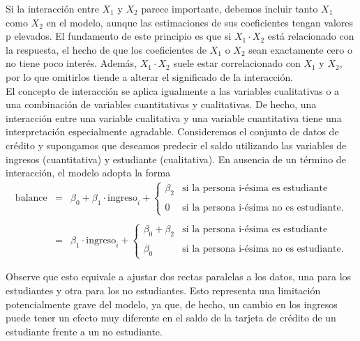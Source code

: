 Si la interacción entre $X_1$ y $X_2$ parece importante, debemos incluir tanto $X_1$ como $X_2$ en el modelo, aunque las estimaciones de sus coeficientes tengan valores p elevados. El fundamento de este principio es que si $X_1 \cdot X_2$ está relacionado con la respuesta, el hecho de que los coeficientes de $X_1$ o $X_2$ sean exactamente cero o no tiene poco interés. Además, $X_1 \cdot X_2$ suele estar correlacionado con $X_1$ y $X_2$, por lo que omitirlos tiende a alterar el significado de la interacción.\\

El concepto de interacción se aplica igualmente a las variables cualitativas o a una combinación de variables cuantitativas y cualitativas. De hecho, una interacción entre una variable cualitativa y una variable cuantitativa tiene una interpretación especialmente agradable. Consideremos el conjunto de datos de crédito y supongamos que deseamos predecir el saldo utilizando las variables de ingresos (cuantitativa) y estudiante (cualitativa). En ausencia de un término de interacción, el modelo adopta la forma
$$
\begin{array}{rcl}
    \mbox{balance} &=& \beta_0+\beta_1\cdot \mbox{ingreso}_i + 
    \left\{
    \begin{array}{ll} 
	\beta_2 & \mbox{si la persona i-ésima es estudiante}\\\\
		0 & \mbox{si la persona i-ésima no es estudiante.}
    \end{array}
    \right.\\\\
		   &=& \beta_1\cdot \mbox{ingreso}_i + 
    \left\{
	\begin{array}{ll}
	    \beta_0+\beta_2 & \mbox{si la persona i-ésima es estudiante}\\\\
	    \beta_0 & \mbox{si la persona i-ésima no es estudiante.}
	\end{array}
	\right.
\end{array}
$$

Observe que esto equivale a ajustar dos rectas paralelas a los datos, una para los estudiantes y otra para los no estudiantes. Esto representa una limitación potencialmente grave del modelo, ya que, de hecho, un cambio en los ingresos puede tener un efecto muy diferente en el saldo de la tarjeta de crédito de un estudiante frente a un no estudiante.

